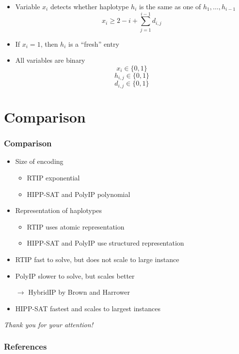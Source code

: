 \documentclass[handout]{beamer}
\begin{document}
\begin{frame}
\begin{itemize}
\item Variable $x_i$ detects whether haplotype $h_i$ is the same as one of $h_1, \dots , h_{i-1}$
$$ x_{i} \geq 2 - i +  \sum_{j=1}^{i-1} d_{i,j} $$
\item If $x_i = 1$, then $h_i$ is a ``fresh'' entry
\item All variables are binary
$$ x_i \in \{0, 1\} $$
$$ h_{i,j} \in \{0, 1\} $$
$$ d_{i,j} \in \{0, 1\} $$
\end{itemize}
\end{frame}

\section{Comparison}
\begin{frame}
\frametitle{Comparison}
\begin{itemize}
\item Size of encoding
\begin{itemize}
\item RTIP exponential
\item HIPP-SAT and PolyIP polynomial
\end{itemize}
\item Representation of haplotypes
\begin{itemize}
\item RTIP uses atomic representation
\item HIPP-SAT and PolyIP use structured representation
\end{itemize}
\item RTIP fast to solve, but does not scale to large instance
\item PolyIP slower to solve, but scales better
\item[$\rightarrow$] HybridIP by Brown and Harrower
\item HIPP-SAT fastest and scales to largest instances
\end{itemize}
\end{frame}

\begin{frame}{}
\centering \LARGE \emph{Thank you for your attention!}
\end{frame}

\begin{frame}[allowframebreaks]
\frametitle{References}
\printbibliography
\end{frame}
\end{document}
